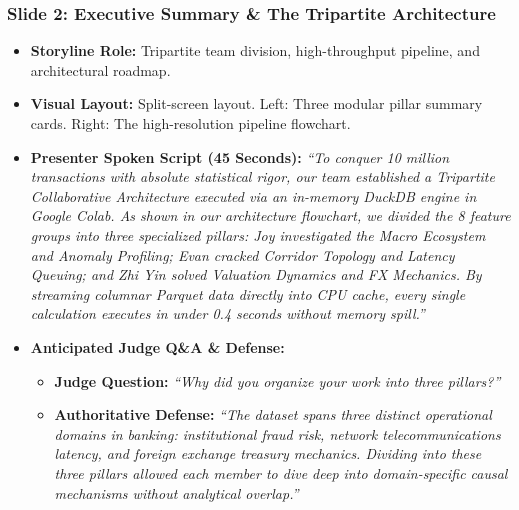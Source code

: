 \documentclass[11pt,a4paper]{article}
\begin{document}
\subsubsection{Slide 2: Executive Summary \& The Tripartite Architecture}
\begin{itemize}
    \item \textbf{Storyline Role:} Tripartite team division, high-throughput pipeline, and architectural roadmap.
    \item \textbf{Visual Layout:} Split-screen layout. Left: Three modular pillar summary cards. Right: The high-resolution pipeline flowchart.
    \item \textbf{Presenter Spoken Script (45 Seconds):}
    \textit{``To conquer 10 million transactions with absolute statistical rigor, our team established a Tripartite Collaborative Architecture executed via an in-memory DuckDB engine in Google Colab. As shown in our architecture flowchart, we divided the 8 feature groups into three specialized pillars: Joy investigated the Macro Ecosystem and Anomaly Profiling; Evan cracked Corridor Topology and Latency Queuing; and Zhi Yin solved Valuation Dynamics and FX Mechanics. By streaming columnar Parquet data directly into CPU cache, every single calculation executes in under 0.4 seconds without memory spill.''}
    \item \textbf{Anticipated Judge Q\&A \& Defense:}
    \begin{itemize}
        \item \textbf{Judge Question:} \textit{``Why did you organize your work into three pillars?''}
        \item \textbf{Authoritative Defense:} \textit{``The dataset spans three distinct operational domains in banking: institutional fraud risk, network telecommunications latency, and foreign exchange treasury mechanics. Dividing into these three pillars allowed each member to dive deep into domain-specific causal mechanisms without analytical overlap.''}
    \end{itemize}
\end{itemize}
\end{document}
